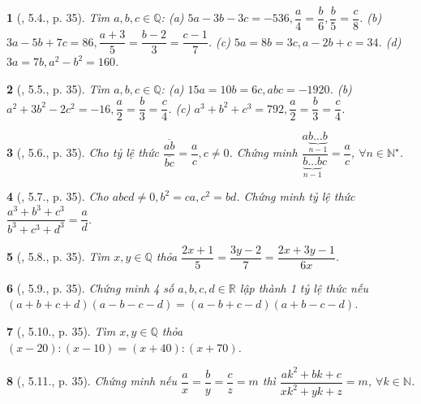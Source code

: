 \documentclass{article}
\newtheorem{baitoan}{}
\begin{document}
\begin{baitoan}[\cite{Binh_boi_duong_Toan_7_tap_1}, 5.4., p. 35]
	Tìm $a,b,c\in\mathbb{Q}$: (a) $5a - 3b - 3c = -536,\dfrac{a}{4} = \dfrac{b}{6},\dfrac{b}{5} = \dfrac{c}{8}$. (b) $3a - 5b + 7c = 86,\dfrac{a + 3}{5} = \dfrac{b - 2}{3} = \dfrac{c - 1}{7}$. (c) $5a = 8b = 3c,a - 2b + c = 34$. (d) $3a = 7b,a^2 - b^2 = 160$.
\end{baitoan}

\begin{baitoan}[\cite{Binh_boi_duong_Toan_7_tap_1}, 5.5., p. 35]
	Tìm $a,b,c\in\mathbb{Q}$: (a) $15a = 10b = 6c,abc = -1920$. (b) $a^2 + 3b^2 - 2c^2 = -16,\dfrac{a}{2} = \dfrac{b}{3} = \dfrac{c}{4}$. (c) $a^3 + b^2 + c^3 = 792,\dfrac{a}{2} = \dfrac{b}{3} = \dfrac{c}{4}$.
\end{baitoan}

\begin{baitoan}[\cite{Binh_boi_duong_Toan_7_tap_1}, 5.6., p. 35]
	Cho tỷ lệ thức $\dfrac{\overline{ab}}{\overline{bc}} = \dfrac{a}{c},c\ne0$. Chứng minh $\dfrac{a\underbrace{b\ldots b}_{n-1}}{\underbrace{b\ldots b}_{n-1}c} = \dfrac{a}{c}$, $\forall n\in\mathbb{N}^\star$.
\end{baitoan}

\begin{baitoan}[\cite{Binh_boi_duong_Toan_7_tap_1}, 5.7., p. 35]
	Cho $abcd\ne0,b^2 = ca,c^2 = bd$. Chứng minh tỷ lệ thức $\dfrac{a^3 + b^3 + c^3}{b^3 + c^3 + d^3} = \dfrac{a}{d}$.
\end{baitoan}

\begin{baitoan}[\cite{Binh_boi_duong_Toan_7_tap_1}, 5.8., p. 35]
	Tìm $x,y\in\mathbb{Q}$ thỏa $\dfrac{2x + 1}{5} = \dfrac{3y - 2}{7} = \dfrac{2x + 3y - 1}{6x}$.
\end{baitoan}

\begin{baitoan}[\cite{Binh_boi_duong_Toan_7_tap_1}, 5.9., p. 35]
	Chứng minh 4 số $a,b,c,d\in\mathbb{R}$ lập thành 1 tỷ lệ thức nếu $(a + b + c + d)(a - b - c - d) = (a - b + c - d)(a + b - c - d)$.
\end{baitoan}

\begin{baitoan}[\cite{Binh_boi_duong_Toan_7_tap_1}, 5.10., p. 35]
	Tìm $x,y\in\mathbb{Q}$ thỏa $(x - 20):(x - 10) = (x + 40):(x + 70)$.
\end{baitoan}

\begin{baitoan}[\cite{Binh_boi_duong_Toan_7_tap_1}, 5.11., p. 35]
	Chứng minh nếu $\dfrac{a}{x} = \dfrac{b}{y} = \dfrac{c}{z} = m$ thì $\dfrac{ak^2 + bk + c}{xk^2 + yk + z} = m$, $\forall k\in\mathbb{N}$.
\end{baitoan}
\end{document}
